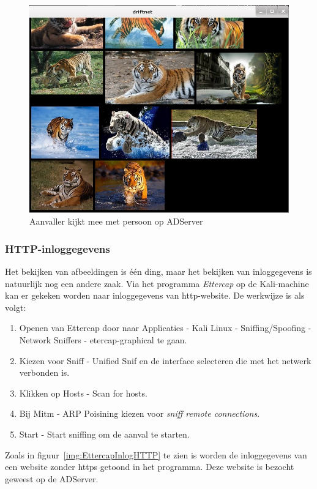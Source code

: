 \documentclass[pdftex,a4paper,12pt]{report}
\begin{document}
\begin{figure}[H]
\begin{center}
\includegraphics[scale=0.60]{img/Driftnet}
\end{center}
\caption{Aanvaller kijkt mee met persoon op ADServer}
\label{img:Driftnet}
\end{figure}

\subsubsection{HTTP-inloggegevens}
Het bekijken van afbeeldingen is één ding, maar het bekijken van inloggegevens is natuurlijk nog een andere zaak. Via het programma \textit{Ettercap} op de Kali-machine kan er gekeken worden naar inloggegevens van http-website. De werkwijze is als volgt:
\begin{enumerate}
	\item Openen van Ettercap door naar Applicaties - Kali Linux - Sniffing/Spoofing - Network Sniffers - etercap-graphical te gaan.
	\item Kiezen voor Sniff - Unified Snif en de interface selecteren die met het netwerk verbonden is.
	\item Klikken op Hosts - Scan for hosts.
	\item Bij Mitm - ARP Poisining kiezen voor \textit{sniff remote connections}.
	\item Start - Start sniffing om de aanval te starten.
\end{enumerate}
Zoals in figuur~\ref{img:EttercapInlogHTTP} te zien is worden de inloggegevens van een website zonder https getoond in het programma. Deze website is bezocht geweest op de ADServer. \citep{DemmSec2013} 
\end{document}
